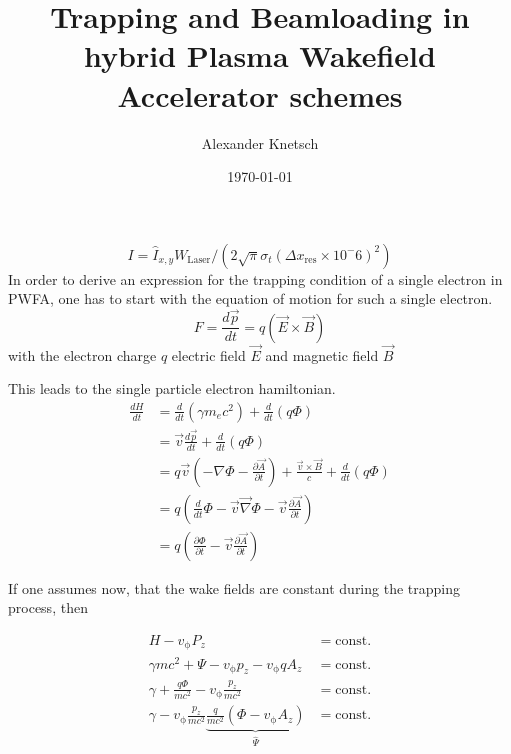\documentclass{thesis}
\title{Trapping and Beamloading in hybrid Plasma Wakefield Accelerator schemes}
\author{Alexander Knetsch}
\date{\today}
\begin{document}
\maketitle
\tableofcontents
$$I=\hat{I}_{x,y}W_\mathrm{Laser}/(2\sqrt{\pi}\sigma_t(\Delta x_\mathrm{res}\times10^-6)^2)$$
In order to derive an expression for the trapping condition of a single electron in PWFA, one has to start with the equation of motion for such a single electron. 
\begin{equation}
F=\frac{d\vec{p}}{dt}=q(\vec{E}\times \vec{B})
\end{equation}
with the electron charge $q$ electric field $\vec{E}$ and magnetic field $\vec{B}$


This leads to the single particle electron hamiltonian. 
\begin{align}
\frac{dH}{dt}&=\frac{d}{dt} (\gamma m_e c^2)+\frac{d}{dt}(q\Phi)\\
&=\vec{v}\frac{d\vec{p}}{dt}+\frac{d}{dt}(q\Phi)\\
&=q\vec{v}(-\nabla \Phi-\frac{\partial \vec{A}}{\partial t})+\frac{\vec{v}\times\vec{B}}{c}+\frac{d}{dt}(q\Phi)\\
&=q(\frac{d}{dt}\Phi-\vec{v}\vec{\nabla}\Phi-\vec{v}\frac{\partial \vec{A}}{\partial t})\\
&=q(\frac{\partial \Phi}{\partial t}-\vec{v}\frac{\partial \vec{A}}{\partial t})
\end{align}

If one assumes now, that the wake fields are constant during the trapping process, then 

\begin{align}
H-v_\mathrm{\phi}P_z &= \mathrm{const.}\\
\gamma m c^2+\Psi-v_\mathrm{\phi}p_z-v_\mathrm{\phi}qA_z &= \mathrm{const.}\\
\gamma+\frac{q \Phi}{m c^2}-v_\mathrm{\phi} \frac{p_z}{mc^2} &= \mathrm{const.}\\
\gamma - v_\mathrm{\phi} \frac{p_z}{mc^2} \underbrace{\frac{q}{mc^2}(\Phi-v_\mathrm{\phi}A_z)}_{\hat{\Psi}}  &= \mathrm{const.} 
\end{align}
\end{document}
